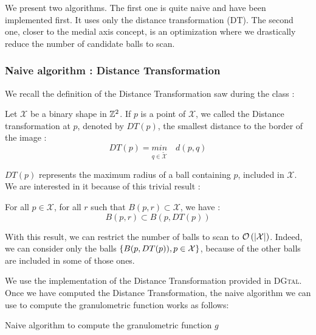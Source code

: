 We present two algorithms. The first one is quite naive and have been implemented first. It uses only the distance transformation (DT). The second one, closer to the medial axis concept, is an optimization where we drastically reduce the number of candidate balls to scan.

\subsubsection{Naive algorithm : Distance Transformation}

We recall the definition of the Distance Transformation saw during the class :

\begin{defi}
Let $\mathcal{X}$ be a binary shape in $\mathbb{Z}^{2}$. If $p$ is a point of $\mathcal{X}$, we called the Distance transformation at $p$, denoted by $DT(p)$, the smallest distance to the border of the image :
$$ DT(p) = \underset{q \in \widetilde{\mathcal{X}}}{min} \quad d(p,q) $$
\end{defi}

$DT(p)$ represents the maximum radius of a ball containing $p$, included in $\mathcal{X}$. We are interested in it because of this trivial result :

\begin{theo}
	For all $p \in \mathcal{X}$, for all $r$ such that $B(p,r) \subset \mathcal{X}$, we have :
		$$ B(p,r) \subset B(p,DT(p))$$
\label{theoremDT}
\end{theo}

With this result, we can restrict the number of balls to scan to $\mathcal O \left( \left| \mathcal{X} \right| \right)$. Indeed, we can consider only the balls $\left\{ B(p,DT(p)), p \in \mathcal{X} \right\}$, because of the other balls are included in some of those ones.

We use the implementation of the Distance Transformation provided in \textsc{DGtal}. Once we have computed the Distance Transformation, the naive algorithm we can use to compute the granulometric function works as follows:

\IncMargin{1em}
\begin{algorithm}
\caption{Naive algorithm to compute the granulometric function $g$}
\label{algo-naive}
\end{algorithm}

